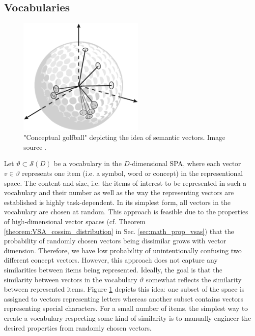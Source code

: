 \subsection{Vocabularies}
\begin{figure}[t]
	\centering
	\includegraphics[width=0.55\textwidth]{imgs/conceptual_golfball.eps}
	\caption{"Conceptual golfball" depicting the idea of semantic vectors. Image source \cite{Eliasmith2013}.}
	\label{fig:conceptual_golfbal}
\end{figure}
Let $\vartheta \subset \mathcal{S}(D)$ be a vocabulary in the $D$-dimensional \ac{SPA}, where each vector $v \in \vartheta$ represents one item (i.e. a symbol, word or concept) in the representional space.
The content and size, i.e. the items of interest to be represented in such a vocabulary and their number as well as the way the representing vectors are established is highly task-dependent.
In its simplest form, all vectors in the vocabulary are chosen at random.
This approach is feasible due to the properties of high-dimensional vector spaces (cf. Theorem \ref{theorem:VSA_cossim_distribution} in Sec. \ref{sec:math_prop_vsas}) that the probability of randomly chosen vectors being dissimilar grows with vector dimension.
Therefore,  we have low probability of unintentionally confusing two different concept vectors.
However, this approach does not capture any similarities between items being represented.
Ideally, the goal is that the similarity between vectors in the vocabulary $\vartheta$ somewhat reflects the similarity between represented items.
Figure \ref{fig:conceptual_golfbal} depicts this idea: one subset of the space is assigned to vectors representing letters whereas another subset contains vectors representing special characters.
For a small number of items, the simplest way to create a vocabulary respecting some kind of similarity is to manually engineer the desired properties from randomly chosen vectors. 
